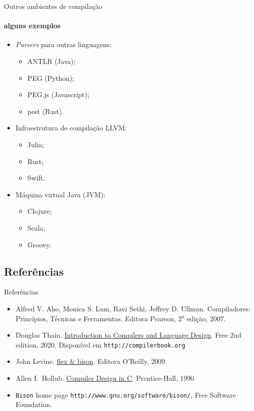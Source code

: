 \begin{frame}{Outros ambientes de compilação}
  \framesubtitle{alguns exemplos}
  \begin{itemize}
  \item {\it Parsers} para outras linguagens:
    \begin{itemize}
    \item ANTLR (Java);
    \item PEG (Python);
    \item PEG.js (Javascript);
    \item pest (Rust).
    \end{itemize}
  \item Infraestrutura de compilação LLVM:
    \begin{itemize}
    \item Julia;
    \item Rust;
    \item Swift.
    \end{itemize}
  \item Máquina virtual Java (JVM):
    \begin{itemize}
    \item Clojure;
    \item Scala;
    \item Groovy.
    \end{itemize}
  \end{itemize}
\end{frame}

\subsection*{Referências}

\begin{frame}{Referências}

  \begin{itemize}
  \item Alfred V. Aho, Monica S. Lam, Ravi Sethi, Jeffrey D. Ullman.
    Compiladores: Princípios, Técnicas e Ferramentas. Editora
    Pearson, 2$^a$ edição, 2007.

  \item Douglas Thain. \href{http://compilerbook.org}{Introduction to
      Compilers and Language Design}. Free 2nd edition, 2020.
    Disponível em {\tt http://compilerbook.org}

  \item John Levine.
    \href{https://www.oreilly.com/library/view/flex-bison/9780596805418/}{flex
      \& bison}. Editora O'Reilly, 2009.

  \item Allen I.\ Hollub.
   \href{https://holub.com/compiler/}{Compiler Design in C}.
    Prentice-Hall, 1990.

  \item {\tt Bison} home page {\tt http://www.gnu.org/software/bison/}, Free
    Software Foundation.
  \end{itemize}
 \end{frame}
